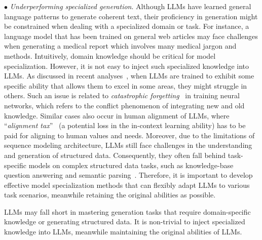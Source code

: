 $\bullet$ {\emph{Underperforming specialized generation}}. Although LLMs have learned general language patterns to generate coherent text, 
their proficiency in generation might be constrained when dealing  with a specialized domain or task. %
{For instance, a language model that has been trained on general web articles may face challenges when generating a medical report  which involves many medical jargon and methods.} 
Intuitively, domain knowledge should be critical for model specialization. However, it is not easy to inject such specialized knowledge into LLMs.   
As discussed in recent analyses~\cite{FU-blog-2022-how,Ye-arxiv-2023-A}, when LLMs are trained to exhibit some specific ability that allows them to excel in some areas, they might struggle in others. Such an issue is related to \emph{catastrophic forgetting}~\cite{Michael-Psychology-1989-Catastrophic, Kemker-AAAI-2018-Measuring} in training neural networks, which refers to the conflict phenomenon of integrating new and old knowledge.  
Similar cases also occur in human alignment of LLMs, where ``\emph{alignment tax}''~\cite{Ouyang-arxiv-2022-Training} (\eg a potential loss in the in-context learning  ability) has to be paid for aligning to human values and needs.  
{
Moreover, due to the limitations of sequence modeling architecture, LLMs still face challenges in the understanding and generation of structured data. Consequently, they often fall behind task-specific models on complex structured data tasks, such as knowledge-base question answering and semantic parsing~\cite{Xie-EMNLP-2022-UnifiedSKG,Jiang-2023-arxiv-StructGPT}.
}
Therefore, it is important to develop effective model specialization methods  that can flexibly adapt LLMs to various task scenarios,  meanwhile retaining the original abilities as possible. 

\begin{center}
\begin{tcolorbox}[colback=blue!5!white,colframe=blue!55!black,width=0.46\textwidth,title={Underperforming Specialized Generation}]
LLMs may fall short in mastering generation tasks that require domain-specific knowledge or generating structured data. It is non-trivial to inject specialized knowledge into LLMs, meanwhile maintaining the original abilities of LLMs.
\end{tcolorbox}
\end{center}

